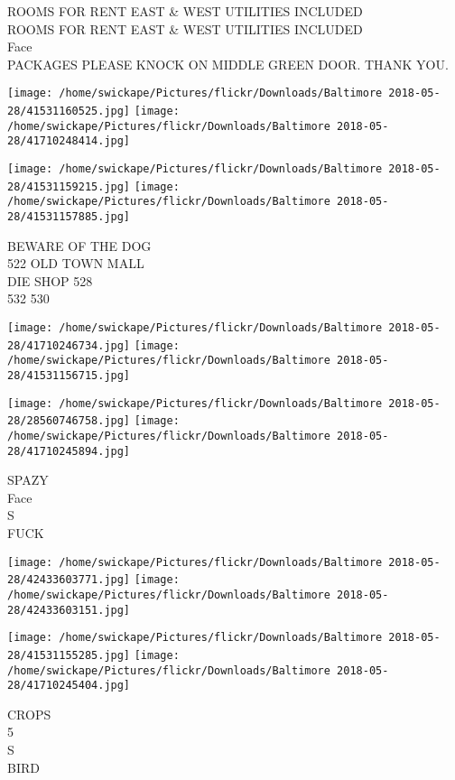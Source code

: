 \documentclass[10pt,letterpaper]{article}
\begin{document}
ROOMS FOR RENT EAST \& WEST UTILITIES INCLUDED\\
ROOMS FOR RENT EAST \& WEST UTILITIES INCLUDED\\
Face\\
PACKAGES PLEASE KNOCK ON MIDDLE GREEN DOOR.  THANK YOU.\\
\pagebreak

\texttt{[image: /home/swickape/Pictures/flickr/Downloads/Baltimore 2018-05-28/41531160525.jpg]}
\texttt{[image: /home/swickape/Pictures/flickr/Downloads/Baltimore 2018-05-28/41710248414.jpg]}

\texttt{[image: /home/swickape/Pictures/flickr/Downloads/Baltimore 2018-05-28/41531159215.jpg]}
\texttt{[image: /home/swickape/Pictures/flickr/Downloads/Baltimore 2018-05-28/41531157885.jpg]}

BEWARE OF THE DOG\\
522 OLD TOWN MALL\\
DIE SHOP 528\\
532 530\\
\pagebreak

\texttt{[image: /home/swickape/Pictures/flickr/Downloads/Baltimore 2018-05-28/41710246734.jpg]}
\texttt{[image: /home/swickape/Pictures/flickr/Downloads/Baltimore 2018-05-28/41531156715.jpg]}

\texttt{[image: /home/swickape/Pictures/flickr/Downloads/Baltimore 2018-05-28/28560746758.jpg]}
\texttt{[image: /home/swickape/Pictures/flickr/Downloads/Baltimore 2018-05-28/41710245894.jpg]}

SPAZY\\
Face\\
S\\
FUCK\\
\pagebreak

\texttt{[image: /home/swickape/Pictures/flickr/Downloads/Baltimore 2018-05-28/42433603771.jpg]}
\texttt{[image: /home/swickape/Pictures/flickr/Downloads/Baltimore 2018-05-28/42433603151.jpg]}

\texttt{[image: /home/swickape/Pictures/flickr/Downloads/Baltimore 2018-05-28/41531155285.jpg]}
\texttt{[image: /home/swickape/Pictures/flickr/Downloads/Baltimore 2018-05-28/41710245404.jpg]}

CROPS\\
5\\
S\\
BIRD\\
\pagebreak
\end{document}
